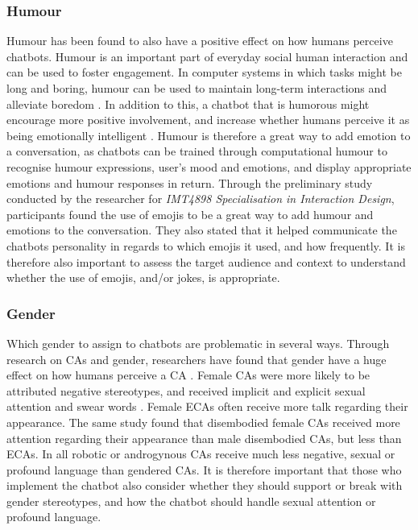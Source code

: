 \subsubsection{Humour}
Humour has been found to also have a positive effect on how humans perceive chatbots. Humour is an important part of everyday social human interaction \citep{Dirk2003} and can be used to foster engagement. In computer systems in which tasks might be long and boring, humour can be used to maintain long-term interactions and alleviate boredom \citep{McTear2016b}. In addition to this, a chatbot that is humorous might encourage more positive involvement, and increase whether humans perceive it as being emotionally intelligent \citep{Dybala2009}. Humour is therefore a great way to add emotion to a conversation, as chatbots can be trained through computational humour \citep{Augello2011} to recognise humour expressions, user’s mood and emotions, and display appropriate emotions and humour responses in return. Through the preliminary study conducted by the researcher for \textit{IMT4898 Specialisation in Interaction Design}, participants found the use of emojis to be a great way to add humour and emotions to the conversation. They also stated that it helped communicate the chatbots personality in regards to which emojis it used, and how frequently. It is therefore also important to assess the target audience and context to understand whether the use of emojis, and/or jokes, is appropriate.

\subsubsection{Gender}
Which gender to assign to chatbots are problematic in several ways. Through research on CAs and gender, researchers have found that gender have a huge effect on how humans perceive a CA \citep{Zimmerman2005, Brahnam2012, vala2011,  kulms2011}. Female CAs were more likely to be attributed negative stereotypes, and received implicit and explicit sexual attention and swear words \citep{Brahnam2012}. Female ECAs often receive more talk regarding their appearance. The same study found that disembodied female CAs received more attention regarding their appearance than male disembodied CAs, but less than ECAs. In all robotic or androgynous CAs receive much less negative, sexual or profound language than gendered CAs. It is therefore important that those who implement the chatbot also consider whether they should support or break with gender stereotypes, and how the chatbot should handle sexual attention or profound language. 


